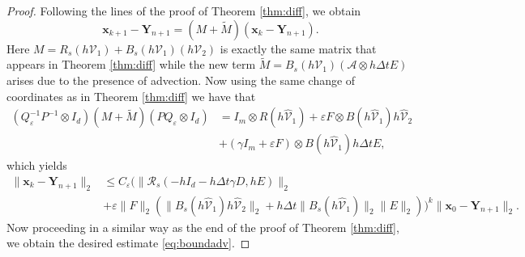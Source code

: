 \documentclass[10pt,a4paper]{article}
\renewcommand{\epsilon}{\varepsilon}
\def \calA{\mathcal{A}}
\begin{document}
\begin{proof}
    Following the lines of the proof of Theorem \ref{thm:diff}, we obtain
$$
\boldsymbol{x}_{k+1} - \boldsymbol{Y}_{n+1}= (M+\tilde M) (\boldsymbol{x}_{k}- \boldsymbol{Y}_{n+1}).
$$
Here $M=R_{s}(h\mathcal{V}_1) + B_{s}(h\mathcal{V}_1)(h\mathcal{V}_2)$ is exactly the same matrix that appears in Theorem \ref{thm:diff} while the new term $\tilde M=B_{s}(h\mathcal{V}_1)(\mathcal{A}\otimes h\Delta t E)$ arises due to the presence of advection.
Now using the same change of coordinates as in Theorem \ref{thm:diff} we have that 
\begin{align*}
(Q_\varepsilon^{-1}P^{-1}\otimes I_d) (M+\tilde M) (PQ_\varepsilon\otimes I_d) &= I_m \otimes R(h\hat{\mathcal{V}}_1) 
+ \varepsilon F \otimes B(h\hat{\mathcal{V}}_1)h\hat{\mathcal{V}}_2 \\
&+ (\gamma I_m+\varepsilon F)\otimes B(h\hat{\mathcal{V}}_1)h\Delta t E,
\end{align*}
which yields
    \begin{align*} 
\|\boldsymbol{x}_k-\boldsymbol{Y}_{n+1}\|_2 &\leq C_\varepsilon
\Big(
 \|\mathcal{R}_{s}(-hI_d - h\Delta t \gamma D,hE) \|_2 \\
&+\varepsilon\|F\|_2 (\|B_s(h\hat{\mathcal{V}}_1)h\hat{\mathcal{V}}_2\|_2 + h\Delta t\|B_s(h\hat{\mathcal{V}}_1)\|_2\|E\|_2)
\Big)^k \|\boldsymbol{x}_0-\boldsymbol{Y}_{n+1}\|_2.
\end{align*} 
Now proceeding in a similar way as the end of the proof of Theorem \ref{thm:diff},
 we obtain the desired estimate \eqref{eq:boundadv}.

\end{proof}
\end{document}
